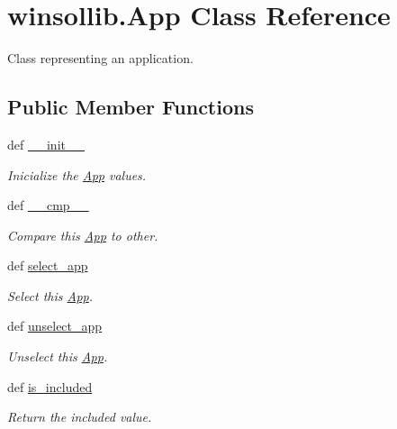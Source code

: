 \hypertarget{classwinsollib_1_1App}{
\section{winsollib.App Class Reference}
\label{classwinsollib_1_1App}
}
Class representing an application.  


\subsection*{Public Member Functions}
\begin{CompactItemize}
\item 
def \hyperlink{classwinsollib_1_1App_edd0227fef6f6212583896750e1986ef}{\_\-\_\-init\_\-\_\-}
\begin{CompactList}\small\item\em Inicialize the \hyperlink{classwinsollib_1_1App}{App} values. \item\end{CompactList}\item 
def \hyperlink{classwinsollib_1_1App_fd54ebb58d1409642f9b649767d6322a}{\_\-\_\-cmp\_\-\_\-}
\begin{CompactList}\small\item\em Compare this \hyperlink{classwinsollib_1_1App}{App} to other. \item\end{CompactList}\item 
def \hyperlink{classwinsollib_1_1App_ded960ca170881c056c50856badbfa48}{select\_\-app}
\begin{CompactList}\small\item\em Select this \hyperlink{classwinsollib_1_1App}{App}. \item\end{CompactList}\item 
def \hyperlink{classwinsollib_1_1App_10672006e430bec96065aff6fbbeadaa}{unselect\_\-app}
\begin{CompactList}\small\item\em Unselect this \hyperlink{classwinsollib_1_1App}{App}. \item\end{CompactList}\item 
def \hyperlink{classwinsollib_1_1App_48008715376100efdc0bc3305f266ee3}{is\_\-included}
\begin{CompactList}\small\item\em Return the {\em included\/} value. \item\end{CompactList}\item 

\end{CompactItemize}
